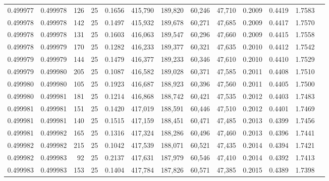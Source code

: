 \begin{tabular}{rrrrrrrrrrrrr}
0.499977 & 0.499978 & 126 &  25 &                                     0.1656 & 415,790 & 189,820 &  60,246 &  47,710 & 0.2009 & 0.4419 & 1.7583 \\
0.499978 & 0.499978 & 142 &  25 &                                     0.1497 & 415,932 & 189,678 &  60,271 &  47,685 & 0.2009 & 0.4417 & 1.7570 \\
0.499978 & 0.499978 & 131 &  25 &                                     0.1603 & 416,063 & 189,547 &  60,296 &  47,660 & 0.2009 & 0.4415 & 1.7558 \\
0.499978 & 0.499979 & 170 &  25 &                                     0.1282 & 416,233 & 189,377 &  60,321 &  47,635 & 0.2010 & 0.4412 & 1.7542 \\
0.499979 & 0.499979 & 144 &  25 &                                     0.1479 & 416,377 & 189,233 &  60,346 &  47,610 & 0.2010 & 0.4410 & 1.7529 \\
0.499979 & 0.499980 & 205 &  25 &                                     0.1087 & 416,582 & 189,028 &  60,371 &  47,585 & 0.2011 & 0.4408 & 1.7510 \\
0.499980 & 0.499980 & 105 &  25 &                                     0.1923 & 416,687 & 188,923 &  60,396 &  47,560 & 0.2011 & 0.4405 & 1.7500 \\
0.499980 & 0.499981 & 181 &  25 &                                     0.1214 & 416,868 & 188,742 &  60,421 &  47,535 & 0.2012 & 0.4403 & 1.7483 \\
0.499981 & 0.499981 & 151 &  25 &                                     0.1420 & 417,019 & 188,591 &  60,446 &  47,510 & 0.2012 & 0.4401 & 1.7469 \\
0.499981 & 0.499981 & 140 &  25 &                                     0.1515 & 417,159 & 188,451 &  60,471 &  47,485 & 0.2013 & 0.4399 & 1.7456 \\
0.499981 & 0.499982 & 165 &  25 &                                     0.1316 & 417,324 & 188,286 &  60,496 &  47,460 & 0.2013 & 0.4396 & 1.7441 \\
0.499982 & 0.499982 & 215 &  25 &                                     0.1042 & 417,539 & 188,071 &  60,521 &  47,435 & 0.2014 & 0.4394 & 1.7421 \\
0.499982 & 0.499983 &  92 &  25 &                                     0.2137 & 417,631 & 187,979 &  60,546 &  47,410 & 0.2014 & 0.4392 & 1.7413 \\
0.499983 & 0.499983 & 153 &  25 &                                     0.1404 & 417,784 & 187,826 &  60,571 &  47,385 & 0.2015 & 0.4389 & 1.7398 \\

\end{tabular}

